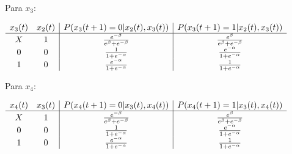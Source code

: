 \documentclass[12pt]{article}
\begin{document}
{Para $x_3$:

$\begin{array}{cc | c | c}
    x_3 (t) &  x_2 (t) &  P (x_3 (t + 1) = 0 | x_2 (t), x_3 (t)) 
                       &  P (x_3 (t + 1) = 1 | x_2 (t), x_3 (t))\\
    \hline
    X     &     1    &     
                          \frac{e^{-\beta}}{e^{\beta} + e^{-\beta}} &
                          \frac{e^{\beta}}{e^{\beta} + e^{-\beta}} \\
    0     &     0    &     
                          \frac{1}{1 + e^{-\alpha}} & 
                          \frac{e^{-\alpha}}{1 + e^{-\alpha}} \\
    1     &     0    &    
                          \frac{e^{-\alpha}}{1 + e^{-\alpha}} & 
                          \frac{1}{1 + e^{-\alpha}} \\
\end{array}$

\bigbreak

Para $x_4$:

$\begin{array}{cc | c | c}
    x_4 (t) &  x_3 (t) &  P (x_4 (t + 1) = 0 | x_3 (t), x_4 (t)) 
                       &  P (x_4 (t + 1) = 1 | x_3 (t), x_4 (t))\\
    \hline
    X     &     1    &     
                          \frac{e^{-\beta}}{e^{\beta} + e^{-\beta}} &
                          \frac{e^{\beta}}{e^{\beta} + e^{-\beta}} \\
    0     &     0    &     
                          \frac{1}{1 + e^{-\alpha}} & 
                          \frac{e^{-\alpha}}{1 + e^{-\alpha}} \\
    1     &     0    &    
                          \frac{e^{-\alpha}}{1 + e^{-\alpha}} & 
                          \frac{1}{1 + e^{-\alpha}} \\
\end{array}$
}
\end{document}

